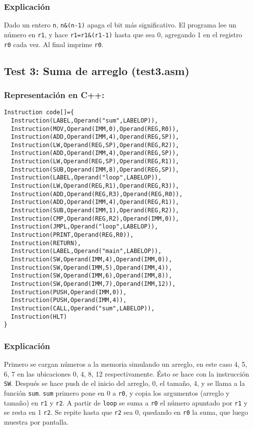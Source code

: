 \documentclass[12pt]{article}
\begin{document}
\subsubsection*{Explicación}
Dado un entero \verb+n+, \verb+n&(n-1)+ apaga el bit más significativo. El programa lee un número en \verb+r1+, y hace \verb+r1=r1&(r1-1)+ hasta que sea 0, agregando 1 en el registro \verb+r0+ cada vez. Al final imprime \verb+r0+.
\subsection*{Test 3: Suma de arreglo (test3.asm)}
\subsubsection*{Representación en C++:}
\begin{verbatim}
Instruction code[]={
  Instruction(LABEL,Operand("sum",LABELOP)),
  Instruction(MOV,Operand(IMM,0),Operand(REG,R0)),
  Instruction(ADD,Operand(IMM,4),Operand(REG,SP)),
  Instruction(LW,Operand(REG,SP),Operand(REG,R2)),
  Instruction(ADD,Operand(IMM,4),Operand(REG,SP)),
  Instruction(LW,Operand(REG,SP),Operand(REG,R1)),
  Instruction(SUB,Operand(IMM,8),Operand(REG,SP)),
  Instruction(LABEL,Operand("loop",LABELOP)),
  Instruction(LW,Operand(REG,R1),Operand(REG,R3)),
  Instruction(ADD,Operand(REG,R3),Operand(REG,R0)),
  Instruction(ADD,Operand(IMM,4),Operand(REG,R1)),
  Instruction(SUB,Operand(IMM,1),Operand(REG,R2)),
  Instruction(CMP,Operand(REG,R2),Operand(IMM,0)),
  Instruction(JMPL,Operand("loop",LABELOP)),
  Instruction(PRINT,Operand(REG,R0)),
  Instruction(RETURN),
  Instruction(LABEL,Operand("main",LABELOP)),
  Instruction(SW,Operand(IMM,4),Operand(IMM,0)),
  Instruction(SW,Operand(IMM,5),Operand(IMM,4)),
  Instruction(SW,Operand(IMM,6),Operand(IMM,8)),
  Instruction(SW,Operand(IMM,7),Operand(IMM,12)),
  Instruction(PUSH,Operand(IMM,0)),
  Instruction(PUSH,Operand(IMM,4)),
  Instruction(CALL,Operand("sum",LABELOP)),
  Instruction(HLT)
}
\end{verbatim}
\subsubsection*{Explicación}
Primero se cargan números a la memoria simulando un arreglo, en este caso 4, 5, 6, 7 en las ubicaciones 0, 4, 8, 12 respectivamente. Ésto se hace con la instrucción \verb+SW+. Después se hace push de el inicio del arreglo, 0, el tamaño, 4, y se llama a la función \verb+sum+. \verb+sum+ primero pone en 0 a \verb+r0+, y copia los argumentos (arreglo y tamaño) en \verb+r1+ y \verb+r2+. A partir de \verb+loop+ se suma a \verb+r0+ el número apuntado por \verb+r1+ y se resta en 1 \verb+r2+. Se repite hasta que \verb+r2+ sea 0, quedando en \verb+r0+ la suma, que luego muestra por pantalla.
\end{document}
